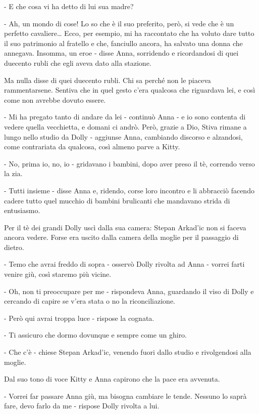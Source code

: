 - E che cosa vi ha detto di lui sua madre? 

- Ah, un mondo di cose! Lo so che è il suo preferito, però, si vede che è un perfetto cavaliere\ldots{} Ecco, per esempio, mi ha raccontato che ha voluto dare tutto il suo patrimonio al fratello e che, fanciullo ancora, ha salvato una donna che annegava. Insomma, un eroe - disse Anna, sorridendo e ricordandosi di quei duecento rubli che egli aveva dato alla stazione. 

Ma nulla disse di quei duecento rubli. Chi sa perché non le piaceva rammentarsene. Sentiva che in quel gesto c'era qualcosa che riguardava lei, e così come non avrebbe dovuto essere. 

- Mi ha pregato tanto di andare da lei - continuò Anna - e io sono contenta di vedere quella vecchietta, e domani ci andrò. Però, grazie a Dio, Stiva rimane a lungo nello studio da Dolly - aggiunse Anna, cambiando discorso e alzandosi, come contrariata da qualcosa, così almeno parve a Kitty. 

- No, prima io, no, io - gridavano i bambini, dopo aver preso il tè, correndo verso la zia. 

- Tutti insieme - disse Anna e, ridendo, corse loro incontro e li abbracciò facendo cadere tutto quel mucchio di bambini brulicanti che mandavano strida di entusiasmo. 

\label{xxi} 

Per il tè dei grandi Dolly uscì dalla sua camera: Stepan Arkad'ic non si faceva ancora vedere. Forse era uscito dalla camera della moglie per il passaggio di dietro. 

- Temo che avrai freddo di sopra - osservò Dolly rivolta ad Anna - vorrei farti venire giù, così staremo più vicine. 

- Oh, non ti preoccupare per me - rispondeva Anna, guardando il viso di Dolly e cercando di capire se v'era stata o no la riconciliazione. 

- Però qui avrai troppa luce - rispose la cognata. 

- Ti assicuro che dormo dovunque e sempre come un ghiro. 

- Che c'è - chiese Stepan Arkad'ic, venendo fuori dallo studio e rivolgendosi alla moglie. 

Dal suo tono di voce Kitty e Anna capirono che la pace era avvenuta. 

- Vorrei far passare Anna giù, ma bisogna cambiare le tende. Nessuno lo saprà fare, devo farlo da me - rispose Dolly rivolta a lui. 

